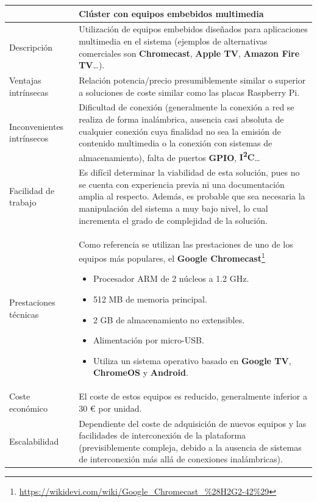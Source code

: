 \begin{table}
\begin{tabular}{|p{2.3cm}|p{11cm}|}
\hline
&\textbf{Clúster con equipos embebidos multimedia}\\
\hline
Descripción&Utilización de equipos embebidos diseñados para aplicaciones multimedia en el sistema (ejemplos de alternativas comerciales son \textbf{Chromecast}, \textbf{Apple TV}, \textbf{Amazon Fire TV}\dots).\\
\hline
Ventajas intrínsecas&Relación potencia/precio presumiblemente similar o superior a soluciones de coste similar como las placas Raspberry Pi.\\
\hline
Inconvenientes intrínsecos&Dificultad de conexión (generalmente la conexión a red se realiza de forma inalámbrica, ausencia casi absoluta de cualquier conexión cuya finalidad no sea la emisión de contenido multimedia o la conexión con sistemas de almacenamiento), falta de puertos \textbf{GPIO}, \textbf{I\textsuperscript{2}C}\dots\\
\hline
Facilidad de trabajo&Es difícil determinar la viabilidad de esta solución, pues no se cuenta con experiencia previa ni una documentación amplia al respecto. Además, es probable que sea necesaria la manipulación del sistema a muy bajo nivel, lo cual incrementa el grado de complejidad de la solución.\\
\hline
Prestaciones técnicas&Como referencia se utilizan las prestaciones de uno de los equipos más populares, el \textbf{Google Chromecast}\footnote{\href{https://wikidevi.com/wiki/Google\_Chromecast\_\%28H2G2-42\%29}{https://wikidevi.com/wiki/Google\_Chromecast\_\%28H2G2-42\%29}}
\begin{itemize}
  \item Procesador ARM de 2 núcleos a 1.2 GHz.
  \item 512 MB de memoria principal.
  \item 2 GB de almacenamiento no extensibles.
  \item Alimentación por micro-USB.
  \item Utiliza un sistema operativo basado en \textbf{Google TV}, \textbf{ChromeOS} y \textbf{Android}.
\end{itemize}\\
\hline
Coste económico&El coste de estos equipos es reducido, generalmente inferior a 30 € por unidad.\\
\hline
Escalabilidad&Dependiente del coste de adquisición de nuevos equipos y las facilidades de interconexión de la plataforma (previsiblemente compleja, debido a la ausencia de sistemas de interconexión más allá de conexiones inalámbricas).\\

\end{tabular}
\end{table}
